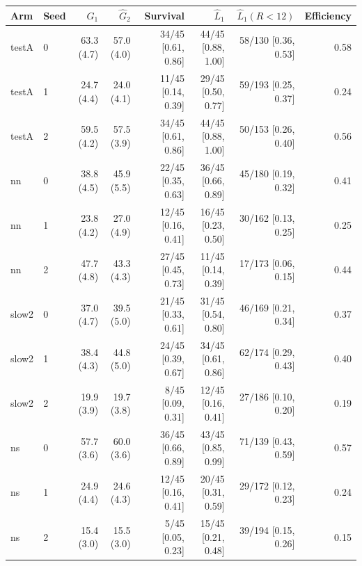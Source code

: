 \begin{tabular}{llrrrrrr}
\toprule
Arm & Seed & $\hat G_1$ & $\hat G_2$ & Survival & $\hat L_1$ & $\hat L_1(R<12)$ & Efficiency \\
\midrule
testA & 0 & 63.3 (4.7) & 57.0 (4.0) & 34/45 [0.61, 0.86] & 44/45 [0.88, 1.00] & 58/130 [0.36, 0.53] & 0.58 \\
testA & 1 & 24.7 (4.4) & 24.0 (4.1) & 11/45 [0.14, 0.39] & 29/45 [0.50, 0.77] & 59/193 [0.25, 0.37] & 0.24 \\
testA & 2 & 59.5 (4.2) & 57.5 (3.9) & 34/45 [0.61, 0.86] & 44/45 [0.88, 1.00] & 50/153 [0.26, 0.40] & 0.56 \\
nn & 0 & 38.8 (4.5) & 45.9 (5.5) & 22/45 [0.35, 0.63] & 36/45 [0.66, 0.89] & 45/180 [0.19, 0.32] & 0.41 \\
nn & 1 & 23.8 (4.2) & 27.0 (4.9) & 12/45 [0.16, 0.41] & 16/45 [0.23, 0.50] & 30/162 [0.13, 0.25] & 0.25 \\
nn & 2 & 47.7 (4.8) & 43.3 (4.3) & 27/45 [0.45, 0.73] & 11/45 [0.14, 0.39] & 17/173 [0.06, 0.15] & 0.44 \\
slow2 & 0 & 37.0 (4.7) & 39.5 (5.0) & 21/45 [0.33, 0.61] & 31/45 [0.54, 0.80] & 46/169 [0.21, 0.34] & 0.37 \\
slow2 & 1 & 38.4 (4.3) & 44.8 (5.0) & 24/45 [0.39, 0.67] & 34/45 [0.61, 0.86] & 62/174 [0.29, 0.43] & 0.40 \\
slow2 & 2 & 19.9 (3.9) & 19.7 (3.8) & 8/45 [0.09, 0.31] & 12/45 [0.16, 0.41] & 27/186 [0.10, 0.20] & 0.19 \\
ns & 0 & 57.7 (3.6) & 60.0 (3.6) & 36/45 [0.66, 0.89] & 43/45 [0.85, 0.99] & 71/139 [0.43, 0.59] & 0.57 \\
ns & 1 & 24.9 (4.4) & 24.6 (4.3) & 12/45 [0.16, 0.41] & 20/45 [0.31, 0.59] & 29/172 [0.12, 0.23] & 0.24 \\
ns & 2 & 15.4 (3.0) & 15.5 (3.0) & 5/45 [0.05, 0.23] & 15/45 [0.21, 0.48] & 39/194 [0.15, 0.26] & 0.15 \\
\bottomrule
\end{tabular}
